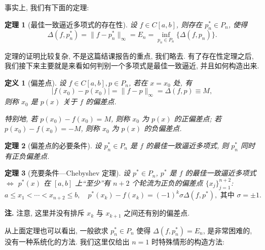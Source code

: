 \documentclass[UTF8, a4paper, 11pt]{ctexart}
\newtheorem{definition}{定义}[section]
\newtheorem{theorem}{定理}[section]
\newenvironment{remark}{\par\textbf{注. }}{\par}
\begin{document}
事实上, 我们有下面的定理: 
\begin{theorem}[最佳一致逼近多项式的存在性]
    设 $ f \in C[a, b] $, 则存在 $ p_n^* \in P_n $, 使得
\[ \Delta(f, p_n^*) = \| f - p_n^* \|_{\infty} = E_n = \inf_{p_n \in P_n} \{ \Delta(f, p_n) \}. \]
\end{theorem}
定理的证明比较复杂, 不是这篇结课报告的重点, 我们略去. 有了存在性定理之后, 我们接下来主要就是来看如何判别一个多项式是最佳一致逼近, 并且如何构造出来.
\begin{definition}[偏差点]
    设 $ f \in C[a, b], p \in P_n $, 若在 $ x = x_0 $ 处, 有
\[ | f(x_0) - p(x_0) | = \| f - p \|_{\infty} = \Delta(f, p) \equiv M, \]
则称 $ x_0 $ 是 $ p(x) $ 关于 $ f $ 的偏差点.

特别地, 若 $ p(x_0) - f(x_0) = M $, 则称 $ x_0 $ 为 $ p(x) $ 的正偏差点; 若 $ p(x_0) - f(x_0) = -M $, 则称 $ x_0 $ 为 $ p(x) $ 的负偏差点.
\end{definition}
\begin{theorem}[偏差点的必要条件]
    设 $ p_n^* \in P_n $ 是 $ f $ 的最佳一致逼近多项式, 则 $ p_n^* $ 同时有正负偏差点.
\end{theorem}
\begin{theorem}[充要条件—Chebyshev 定理]
    设 $ p^* \in P_n $, $ p^* $ 是 $ f $ 的最佳一致逼近多项式 $ \Longleftrightarrow $ $ p^*(x) $ 在 $[a, b]$ 上“至少”有 $ n+2 $ 个轮流为正负的偏差点 $\{x_j\}_{j=1}^{n+2}$: 
    \begin{equation}
    a \leq x_1 < \cdots < x_{n+2} \leq b, \quad p^*(x_k) - f(x_k) = (-1)^k \sigma \Delta(f, p^*), \text{ 其中 } \sigma = \pm 1.
    \end{equation}
\end{theorem}
\begin{remark}
    注意, 这里并没有排斥 $ x_k $ 与 $ x_{k+1} $ 之间还有别的偏差点.
\end{remark}
从上面定理也可以看出, 一般欲求 $ p_n^* \in P_n $ 使得 $ \Delta(f, p_n^*) = E_n $, 是非常困难的, 没有一种系统化的方法.
我们这里仅给出 $ n = 1 $ 时特殊情形的构造方法:
\end{document}
